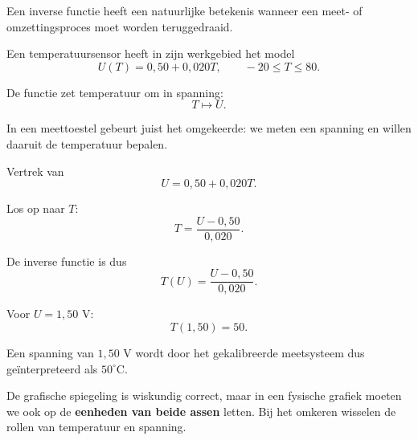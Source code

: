 \documentclass{ximera}
\begin{document}


Een inverse functie heeft een natuurlijke betekenis wanneer een meet- of
omzettingsproces moet worden teruggedraaid.

\begin{voorbeeld}

Een temperatuursensor heeft in zijn werkgebied het model
\[
U(T)=0{,}50+0{,}020T,
\qquad -20\leq T\leq80.
\]

De functie zet temperatuur om in spanning:
\[
T\longmapsto U.
\]

In een meettoestel gebeurt juist het omgekeerde: we meten een spanning en
willen daaruit de temperatuur bepalen.

Vertrek van
\[
U=0{,}50+0{,}020T.
\]

Los op naar \(T\):
\[
T=\frac{U-0{,}50}{0{,}020}.
\]

De inverse functie is dus
\[
\boxed{T(U)=\frac{U-0{,}50}{0{,}020}.}
\]

Voor \(U=1{,}50\) V:
\[
T(1{,}50)=50.
\]

Een spanning van \(1{,}50\) V wordt door het gekalibreerde meetsysteem
dus geïnterpreteerd als \(50^\circ\mathrm C\).

\begin{center}
\end{center}

De grafische spiegeling is wiskundig correct, maar in een fysische grafiek
moeten we ook op de \textbf{eenheden van beide assen} letten. Bij het omkeren
wisselen de rollen van temperatuur en spanning.
\end{voorbeeld}

\end{document}
